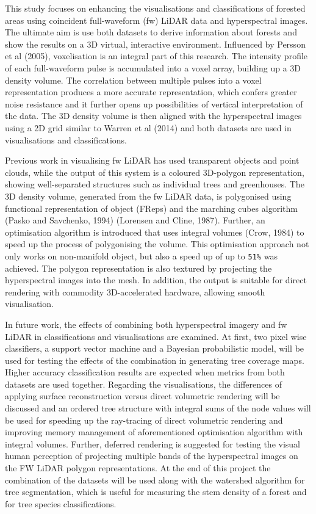 \documentclass{subfiles}
\begin{document}
	\par This study focuses on enhancing the visualisations and classifications of forested areas using coincident full-waveform (fw) LiDAR data and hyperspectral images. The ultimate aim is use both datasets to derive information about forests and show the results on a 3D virtual, interactive environment. Influenced by Persson et al (2005), voxelisation is an integral part of this research. The intensity profile of each full-waveform pulse is accumulated into a voxel array, building up a 3D density volume. The correlation between multiple pulses into a voxel representation produces a more accurate representation, which confers greater noise resistance and it further opens up possibilities of vertical interpretation of the data. The 3D density volume is then aligned with the hyperspectral images using a 2D grid similar to Warren et al (2014) and both datasets are used in visualisations and classifications. 
	\par Previous work in visualising fw LiDAR has used transparent objects and point clouds, while the output of this system is a coloured 3D-polygon representation, showing well-separated structures such as individual trees and greenhouses. The 3D density volume, generated from the fw LiDAR data, is polygonised using functional representation of object (FReps) and the marching cubes algorithm (Pasko and Savchenko, 1994) (Lorensen and Cline, 1987). Further, an optimisation algorithm is introduced that uses integral volumes (Crow, 1984) to speed up the process of polygonising the volume. This optimisation approach not only works on non-manifold object, but also a speed up of up to \verb|51%| was achieved. The polygon representation is also textured by projecting the hyperspectral images into the mesh. In addition, the output is suitable for direct rendering with commodity 3D-accelerated hardware, allowing smooth visualisation. 
	\par In future work, the effects of combining both hyperspectral imagery and fw LiDAR in classifications and visualisations are examined. At first, two pixel wise classifiers, a support vector machine and a Bayesian probabilistic model, will be used for testing the effects of the combination in generating tree coverage maps. Higher accuracy classification results are expected when metrics from both datasets are used together. Regarding the visualisations, the differences of applying surface reconstruction versus direct volumetric rendering will be discussed and an ordered tree structure with integral sums of the node values will be used for speeding up the ray-tracing of direct volumetric rendering and improving memory management of aforementioned optimisation algorithm with integral volumes. Further, deferred rendering is suggested for testing the visual human perception of projecting multiple bands of the hyperspectral images on the FW LiDAR polygon representations. At the end of this project the combination of the datasets will be used along with the watershed algorithm for tree segmentation, which is useful for measuring the stem density of a forest and for tree species classifications. 
	
	
\end{document}
